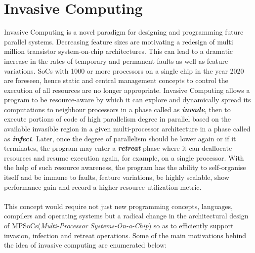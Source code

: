\chapter{Invasive Computing}
\label{chapter:invasive computing}
Invasive Computing\cite{teich} is a novel paradigm for designing and programming future parallel systems. Decreasing feature sizes are motivating a redesign of multi million transistor system-on-chip architectures. This can lead to a dramatic increase in the rates of temporary and permanent faults as well as feature variations. SoCs with 1000 or more processors on a single chip in the year 2020 are foreseen, hence static and central management concepts to control the execution of all resources are no longer appropriate. Invasive Computing allows a program to be resource-aware by which it can explore and dynamically spread its computations to neighbour processors in a phase called as \textbf{\textit{invade}}, then to execute portions of code of high parallelism degree in parallel based on the available invasible region in a given multi-processor architecture in a phase called as \textbf{\textit{infect}}. Later, once the degree of parallelism should be lower again or if it terminates, the program may enter a \textbf{\textit{retreat}} phase where it can deallocate resources and resume execution again, for example, on a single processor. With the help of such resource awareness, the program has the ability to self-organise itself and be immune to faults, feature variations, be highly scalable, show performance gain and record a higher resource utilization metric.\\ \\
This concept would require not just new programming concepts, languages, compilers and operating systems but a radical change in the architectural design of MPSoCs(\textit{Multi-Processor Systems-On-a-Chip}) so as to efficiently support invasion, infection and retreat operations. Some of the main motivations behind the idea of invasive computing are enumerated below:
